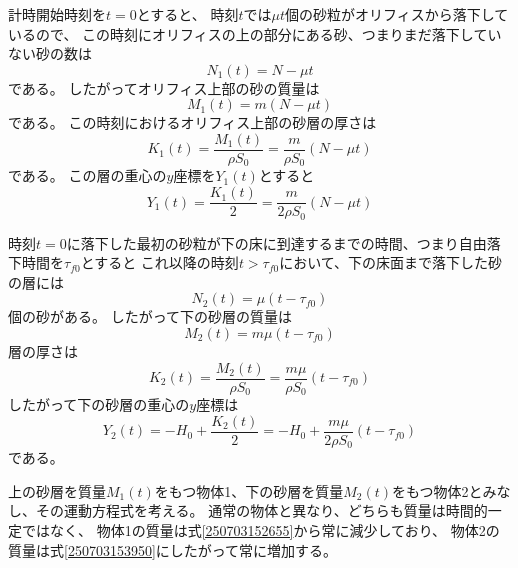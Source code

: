 \documentclass[]{article}
\begin{document}
計時開始時刻を$t=0$とすると、
時刻$t$では$\mu t$個の砂粒がオリフィスから落下しているので、
この時刻にオリフィスの上の部分にある砂、つまりまだ落下していない砂の数は
\begin{equation} \label{250703152453} 
   N_1(t) =  N - \mu t
\end{equation}
である。
したがってオリフィス上部の砂の質量は
\begin{equation} \label{250703152655} 
   M_1(t) = m (N-\mu t)
\end{equation}
である。
この時刻におけるオリフィス上部の砂層の厚さは
\begin{equation} \label{250703152748} 
   K_1(t) = \frac{M_1(t)}{\rho S_0} = \frac{m}{\rho S_0}(N-\mu t)
\end{equation}
である。
この層の重心の$y$座標を$Y_1(t)$とすると
\begin{equation} \label{250703153013} 
   Y_1(t) = \frac{K_1(t)}{2} = \frac{m}{2\rho S_0} ( N - \mu t)
\end{equation}


時刻$t=0$に落下した最初の砂粒が下の床に到達するまでの時間、つまり自由落下時間を$\tau_{f0}$とすると
これ以降の時刻$t>\tau_{f0}$において、下の床面まで落下した砂の層には
\begin{equation} \label{250703153525} 
   N_2(t) = \mu ( t - \tau_{f0})
\end{equation}
個の砂がある。
したがって下の砂層の質量は
\begin{equation} \label{250703153950} 
   M_2(t) = m\mu(t-\tau_{f0})
\end{equation}
層の厚さは
\begin{equation} \label{250703154021} 
   K_2(t) = \frac{M_2(t)}{\rho S_0} = \frac{m\mu}{\rho S_0} (t-\tau_{f0})
\end{equation}
したがって下の砂層の重心の$y$座標は
\begin{equation} \label{250703154424} 
   Y_2(t) = -H_0 + \frac{K_2(t)}{2} = -H_0 + \frac{m\mu}{2\rho S_0} (t-\tau_{f0})
\end{equation}
である。


上の砂層を質量$M_1(t)$をもつ物体1、下の砂層を質量$M_2(t)$をもつ物体2とみなし、その運動方程式を考える。
通常の物体と異なり、どちらも質量は時間的一定ではなく、
物体1の質量は式\eqref{250703152655}から常に減少しており、
物体2の質量は式\eqref{250703153950}にしたがって常に増加する。
\end{document}
